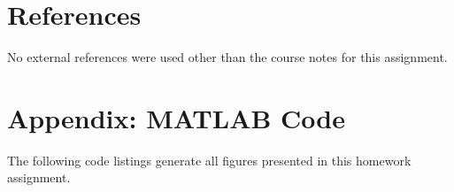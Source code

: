 \documentclass[12pt]{article}
\begin{document}
\section{References} %

No external references were used other than the course notes for this assignment.

\section*{Appendix: MATLAB Code} %

The following code listings generate all figures presented in this homework assignment.


\end{document}
